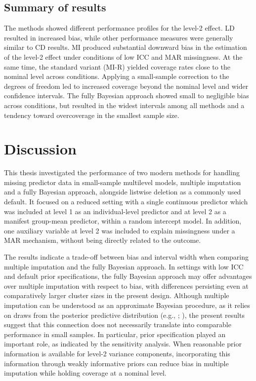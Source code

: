 \documentclass[
  letterpaper,
  11pt,
  english,
  singlespacing,
  headsepline,
  openany]{MastersDoctoralThesis}
\begin{document}
\section{Summary of results}\label{summary-of-results}

The methods showed different performance profiles for the level-2
effect. LD resulted in increased bias, while other performance measures
were generally similar to CD results. MI produced substantial downward
bias in the estimation of the level-2 effect under conditions of low ICC
and MAR missingness. At the same time, the standard variant (MI-R)
yielded coverage rates close to the nominal level across conditions.
Applying a small-sample correction to the degrees of freedom led to
increased coverage beyond the nominal level and wider confidence
intervals. The fully Bayesian approach showed small to negligible bias
across conditions, but resulted in the widest intervals among all
methods and a tendency toward overcoverage in the smallest sample size.


\chapter{Discussion}\label{discussion}

This thesis investigated the performance of two modern methods for
handling missing predictor data in small-sample multilevel models,
multiple imputation and a fully Bayesian approach, alongside listwise
deletion as a commonly used default. It focused on a reduced setting
with a single continuous predictor which was included at level 1 as an
individual-level predictor and at level 2 as a manifest group-mean
predictor, within a random intercept model. In addition, one auxiliary
variable at level 2 was included to explain missingness under a MAR
mechanism, without being directly related to the outcome.

The results indicate a trade-off between bias and interval width when
comparing multiple imputation and the fully Bayesian approach. In
settings with low ICC and default prior specifications, the fully
Bayesian approach may offer advantages over multiple imputation with
respect to bias, with differences persisting even at comparatively
larger cluster sizes in the present design. Although multiple imputation
can be understood as an approximate Bayesian procedure, as it relies on
draws from the posterior predictive distribution (e.g.,
;
), the present results
suggest that this connection does not necessarily translate into
comparable performance in small samples. In particular, prior
specification played an important role, as indicated by the sensitivity
analysis. When reasonable prior information is available for level-2
variance components, incorporating this information through weakly
informative priors can reduce bias in multiple imputation while holding
coverage at a nominal level.
\end{document}
